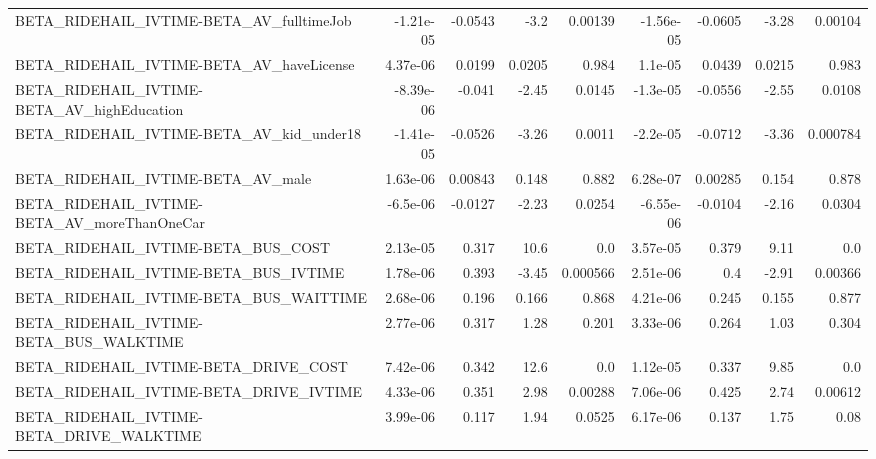 \begin{tabular}{lrrrrrrrr}
BETA\_RIDEHAIL\_IVTIME-BETA\_AV\_fulltimeJob           &   -1.21e-05 &      -0.0543 &      -3.2 &  0.00139 &  -1.56e-05 &     -0.0605 &        -3.28 &       0.00104 \\
BETA\_RIDEHAIL\_IVTIME-BETA\_AV\_haveLicense           &    4.37e-06 &       0.0199 &    0.0205 &    0.984 &    1.1e-05 &      0.0439 &       0.0215 &         0.983 \\
BETA\_RIDEHAIL\_IVTIME-BETA\_AV\_highEducation         &   -8.39e-06 &       -0.041 &     -2.45 &   0.0145 &   -1.3e-05 &     -0.0556 &        -2.55 &        0.0108 \\
BETA\_RIDEHAIL\_IVTIME-BETA\_AV\_kid\_under18           &   -1.41e-05 &      -0.0526 &     -3.26 &   0.0011 &   -2.2e-05 &     -0.0712 &        -3.36 &      0.000784 \\
BETA\_RIDEHAIL\_IVTIME-BETA\_AV\_male                  &    1.63e-06 &      0.00843 &     0.148 &    0.882 &   6.28e-07 &     0.00285 &        0.154 &         0.878 \\
BETA\_RIDEHAIL\_IVTIME-BETA\_AV\_moreThanOneCar        &    -6.5e-06 &      -0.0127 &     -2.23 &   0.0254 &  -6.55e-06 &     -0.0104 &        -2.16 &        0.0304 \\
BETA\_RIDEHAIL\_IVTIME-BETA\_BUS\_COST                 &    2.13e-05 &        0.317 &      10.6 &      0.0 &   3.57e-05 &       0.379 &         9.11 &           0.0 \\
BETA\_RIDEHAIL\_IVTIME-BETA\_BUS\_IVTIME               &    1.78e-06 &        0.393 &     -3.45 & 0.000566 &   2.51e-06 &         0.4 &        -2.91 &       0.00366 \\
BETA\_RIDEHAIL\_IVTIME-BETA\_BUS\_WAITTIME             &    2.68e-06 &        0.196 &     0.166 &    0.868 &   4.21e-06 &       0.245 &        0.155 &         0.877 \\
BETA\_RIDEHAIL\_IVTIME-BETA\_BUS\_WALKTIME             &    2.77e-06 &        0.317 &      1.28 &    0.201 &   3.33e-06 &       0.264 &         1.03 &         0.304 \\
BETA\_RIDEHAIL\_IVTIME-BETA\_DRIVE\_COST               &    7.42e-06 &        0.342 &      12.6 &      0.0 &   1.12e-05 &       0.337 &         9.85 &           0.0 \\
BETA\_RIDEHAIL\_IVTIME-BETA\_DRIVE\_IVTIME             &    4.33e-06 &        0.351 &      2.98 &  0.00288 &   7.06e-06 &       0.425 &         2.74 &       0.00612 \\
BETA\_RIDEHAIL\_IVTIME-BETA\_DRIVE\_WALKTIME           &    3.99e-06 &        0.117 &      1.94 &   0.0525 &   6.17e-06 &       0.137 &         1.75 &          0.08 \\

\end{tabular}
